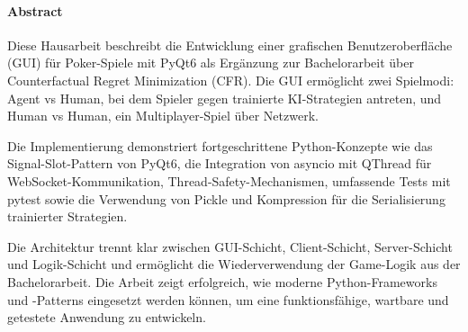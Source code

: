 \paragraph{Abstract}

Diese Hausarbeit beschreibt die Entwicklung einer grafischen Benutzeroberfläche (GUI) für Poker-Spiele mit PyQt6 als Ergänzung zur Bachelorarbeit über Counterfactual Regret Minimization (CFR).
Die GUI ermöglicht zwei Spielmodi: Agent vs Human, bei dem Spieler gegen trainierte KI-Strategien antreten, und Human vs Human, ein Multiplayer-Spiel über Netzwerk.

Die Implementierung demonstriert fortgeschrittene Python-Konzepte wie das Signal-Slot-Pattern von PyQt6, die Integration von asyncio mit QThread für WebSocket-Kommunikation, Thread-Safety-Mechanismen, umfassende Tests mit pytest sowie die Verwendung von Pickle und Kompression für die Serialisierung trainierter Strategien.

Die Architektur trennt klar zwischen GUI-Schicht, Client-Schicht, Server-Schicht und Logik-Schicht und ermöglicht die Wiederverwendung der Game-Logik aus der Bachelorarbeit.
Die Arbeit zeigt erfolgreich, wie moderne Python-Frameworks und -Patterns eingesetzt werden können, um eine funktionsfähige, wartbare und getestete Anwendung zu entwickeln.
